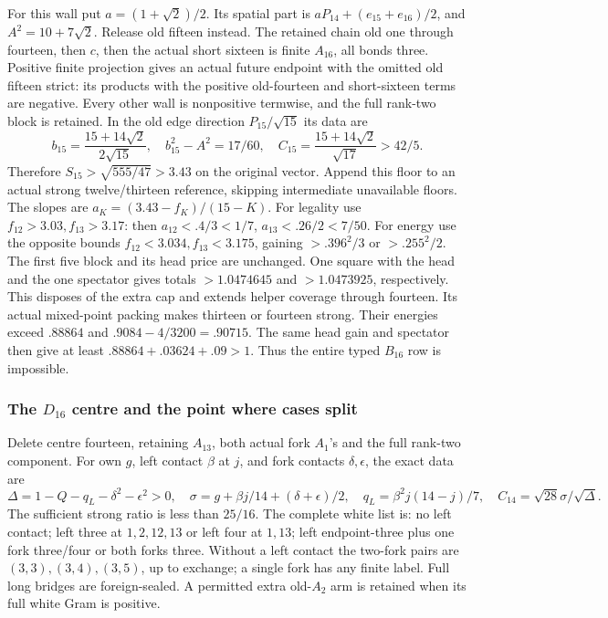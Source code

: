 \documentclass[11pt]{article}
\theoremstyle{definition}
\theoremstyle{remark}
\begin{document}
For this wall put \(a=(1+\sqrt2)/2\). Its spatial part is
\(aP_{14}+(e_{15}+e_{16})/2\), and \(A^2=10+7\sqrt2\).
Release old fifteen instead. The retained chain
old one through fourteen, then \(c\), then the actual short sixteen
is finite \(A_{16}\), all bonds three. Positive finite projection
gives an actual future endpoint with the omitted old fifteen strict:
its products with the positive old-fourteen and short-sixteen terms
are negative. Every other wall is nonpositive termwise, and the full
rank-two block is retained. In the old edge direction
\(P_{15}/\sqrt{15}\) its data are
\[
 b_{15}={\frac{15+14\sqrt2}{2\sqrt{15}}},\quad
 b_{15}^2-A^2=17/60,\quad
 C_{15}={\frac{15+14\sqrt2}{\sqrt{17}}}>42/5.
\]
Therefore \(S_{15}>\sqrt{555/47}>3.43\) on the original vector.
Append this floor to an actual strong twelve/thirteen reference,
skipping intermediate unavailable floors. The slopes are
\(a_K=(3.43-f_K)/(15-K)\). For legality use
\(f_{12}>3.03,f_{13}>3.17\): then
\(a_{12}<.4/3<1/7\), \(a_{13}<.26/2<7/50\).
For energy use the opposite bounds
\(f_{12}<3.034,f_{13}<3.175\), gaining
\(>.396^2/3\) or \(>.255^2/2\).
The first five block and its head price are unchanged. One square
with the head and the one spectator gives totals
\(>1.0474645\) and \(>1.0473925\), respectively.
This disposes of the extra cap and extends helper coverage through
fourteen. Its actual mixed-point packing makes thirteen or fourteen
strong. Their energies exceed \(.88864\) and
\(.9084-4/3200=.90715\). The same head gain and spectator
then give at least \(.88864+.03624+.09>1\).
Thus the entire typed \(B_{16}\) row is impossible.

\subsubsection[The D16 centre and the point where cases split]{The \(D_{16}\) centre and the point where cases split}
Delete centre fourteen, retaining \(A_{13}\), both actual fork
\(A_1\)'s and the full rank-two component. For own \(g\), left
contact \(\beta\) at \(j\), and fork contacts \(\delta,\epsilon\),
the exact data are
\[
 \Delta=1-Q-q_L-\delta^2-\epsilon^2>0,\quad
 \sigma=g+\beta j/14+(\delta+\epsilon)/2,\quad
 q_L=\beta^2j(14-j)/7,\quad C_{14}=\sqrt{28}\sigma/\sqrt\Delta.
\]
The sufficient strong ratio is less than \(25/16\).
The complete white list is: no left contact; left three at
\(1,2,12,13\) or left four at \(1,13\); left endpoint-three
plus one fork three/four or both forks three. Without a left
contact the two-fork pairs are \((3,3),(3,4),(3,5)\), up to
exchange; a single fork has any finite label. Full long bridges
are foreign-sealed. A permitted extra old-\(A_2\) arm is retained
when its full white Gram is positive.
\end{document}
